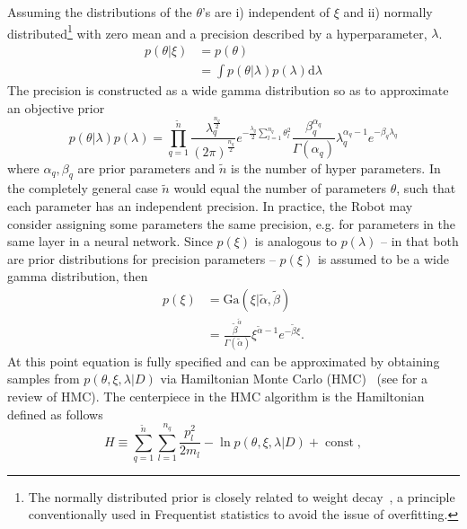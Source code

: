 Assuming the distributions of the $\theta$'s are i) independent of $\xi$ and ii) normally distributed\footnote{The normally distributed prior is closely related to weight decay~\citep{Plaut1986}, a principle conventionally used in Frequentist statistics to avoid the issue of overfitting.} with zero mean and a precision described by a hyperparameter, $\lambda$. 	 
\begin{equation}
	\begin{split}
		p(\theta|\xi) & = p(\theta)\\
		& = \int p(\theta|\lambda)p(\lambda) \mathrm{d}\lambda
	\end{split}
	\label{eq:prior1}
\end{equation}
The precision is constructed as a wide gamma distribution so as to approximate an objective prior
\begin{equation}
	p(\theta|\lambda)p(\lambda)
	= \prod_{q=1}^{\tilde{n}} \frac{\lambda_q^\frac{n_q}{2}}{(2\pi)^\frac{n_q}{2}}e^{-\frac{\lambda_q}{2}\sum_{l=1}^{n_q}\theta_l^2}\frac{\beta_q^{\alpha_q}}{\Gamma(\alpha_q)}\lambda_q^{\alpha_q-1}e^{-\beta_q \lambda_q}
	\label{eq:prior}
\end{equation}
where $\alpha_q,\beta_q$ are prior parameters and $\tilde{n}$ is the number of hyper parameters. In the completely general case $\tilde{n}$ would equal the number of parameters $\theta$, such that each parameter has an independent precision. In practice, the Robot may consider assigning some parameters the same precision, e.g. for parameters in the same layer in a neural network. Since $p(\xi)$ is analogous to $p(\lambda)$ -- in that both are prior distributions for precision parameters -- $p(\xi)$ is assumed to be a wide gamma distribution, then
\begin{equation}
	\begin{split}
		p(\xi) & = \text{Ga}(\xi|\tilde{\alpha},\tilde{\beta})\\
		& =\frac{\tilde{\beta}^{\tilde{\alpha}}}{\Gamma(\tilde{\alpha})}\xi^{\tilde{\alpha}-1}e^{-\tilde{\beta} \xi}.
	\end{split}
	\label{p7}
\end{equation}
At this point equation  is fully specified and can be approximated by obtaining samples from $p(\theta,\xi,\lambda|D)$ via Hamiltonian Monte Carlo (HMC)~\citep{Hammersley1964,Duane:1987de,Neal:1996,Neal2012} (see  for a review of HMC). The centerpiece in the HMC algorithm is the Hamiltonian defined as follows~\citep{Neal:1996,Neal2012}
\begin{equation}
	H \equiv  \sum_{q=1}^{\tilde{n}}\sum_{l=1}^{n_q}\frac{p_{l}^2}{2m_{l}}-\ln p(\theta,\xi,\lambda|D)+\operatorname{const},
	\label{eqh}
\end{equation}
